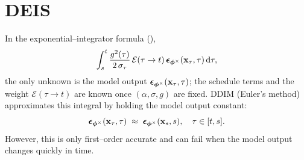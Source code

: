




\clearpage
\newpage

\section{\texorpdfstring{DEIS}{DEIS}}\label{sec:exponential}
In the exponential–integrator formula (),
\[
\int_{s}^{t}
\frac{g^2(\tau)}{2\,\sigma_\tau}\,
\mathcal{E}(\tau \to  t)\,
{\bm{\epsilon}}_{\bm{\phi}^\times}({\mathbf{x}}_\tau,\tau)\mathop{}\!\mathrm{d}\tau,
\]
the only unknown is the model output ${\bm{\epsilon}}_{\bm{\phi}^\times}({\mathbf{x}}_\tau,\tau)$;
the schedule terms and the weight $\mathcal{E}(\tau \to  t)$ are known once $(\alpha,\sigma,g)$
are fixed. DDIM (Euler’s method) approximates this integral by holding the model output constant:
\[
{\bm{\epsilon}}_{\bm{\phi}^\times}({\mathbf{x}}_\tau,\tau)\;\approx\;{\bm{\epsilon}}_{\bm{\phi}^\times}({\mathbf{x}}_s,s),\quad \tau\in[t,s].
\]
However, this is only first–order accurate and can fail when the model output changes quickly in time. 


